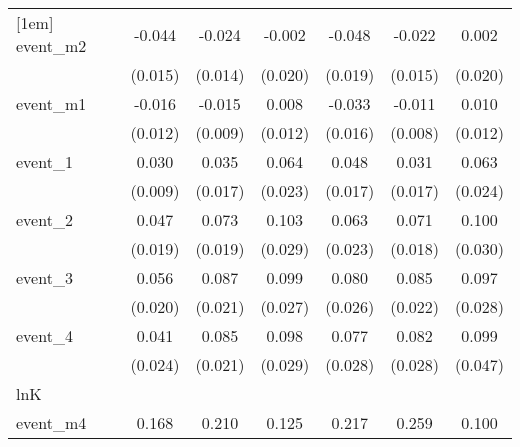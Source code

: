 {\begin{tabular}{l*{6}{c}}
[1em]
event\_m2    &      -0.044\sym{**} &      -0.024         &      -0.002         &      -0.048\sym{*}  &      -0.022         &       0.002         \\
            &     (0.015)         &     (0.014)         &     (0.020)         &     (0.019)         &     (0.015)         &     (0.020)         \\
[1em]
event\_m1    &      -0.016         &      -0.015         &       0.008         &      -0.033\sym{*}  &      -0.011         &       0.010         \\
            &     (0.012)         &     (0.009)         &     (0.012)         &     (0.016)         &     (0.008)         &     (0.012)         \\
[1em]
event\_1     &       0.030\sym{**} &       0.035\sym{*}  &       0.064\sym{**} &       0.048\sym{**} &       0.031         &       0.063\sym{**} \\
            &     (0.009)         &     (0.017)         &     (0.023)         &     (0.017)         &     (0.017)         &     (0.024)         \\
[1em]
event\_2     &       0.047\sym{*}  &       0.073\sym{***}&       0.103\sym{***}&       0.063\sym{**} &       0.071\sym{***}&       0.100\sym{***}\\
            &     (0.019)         &     (0.019)         &     (0.029)         &     (0.023)         &     (0.018)         &     (0.030)         \\
[1em]
event\_3     &       0.056\sym{**} &       0.087\sym{***}&       0.099\sym{***}&       0.080\sym{**} &       0.085\sym{***}&       0.097\sym{***}\\
            &     (0.020)         &     (0.021)         &     (0.027)         &     (0.026)         &     (0.022)         &     (0.028)         \\
[1em]
event\_4     &       0.041         &       0.085\sym{***}&       0.098\sym{***}&       0.077\sym{**} &       0.082\sym{**} &       0.099\sym{*}  \\
            &     (0.024)         &     (0.021)         &     (0.029)         &     (0.028)         &     (0.028)         &     (0.047)         \\
\hline
lnK         &                     &                     &                     &                     &                     &                     \\
event\_m4    &       0.168\sym{**} &       0.210\sym{**} &       0.125         &       0.217\sym{**} &       0.259\sym{***}&       0.100         \\

\end{tabular}}
